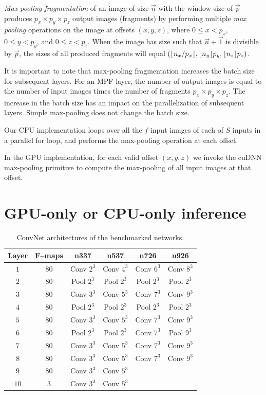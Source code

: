 \documentclass[conference]{./IEEEtran/IEEEtran}
\DeclarePairedDelimiter{\floor}{\lfloor}{\rfloor}
\begin{document}
  \emph{Max pooling fragmentation} of an image of size $\vec{n}$ with the
  window size of $\vec{p}$ produces $p_x \times p_y \times p_z$ output
  images (fragments) by performing multiple \emph{max pooling}
  operations on the image at offsets $(x,y,z)$, where $0 \le x < p_x$,
  $0 \le y < p_y$, and $0 \le z < p_z$.  When the image has size such
  that $\vec{n} + \vec{1}$ is divisible by $\vec{p}$, the sizes of all
  produced fragments will equal
  $(\floor{n_x/p_x},\floor{n_y}{p_y},\floor{n_z}{p_z})$.

  It is important to note that max-pooling fragmentation increases the
  batch size for subsequent layers.  For an MPF layer, the number of
  output images is equal to the number of input images times the
  number of fragments $p_x \times p_y \times p_z$.  The increase in
  the batch size has an impact on the parallelization of subsequent
  layers.  Simple max-pooling does not change the batch size.

  Our CPU implementation loops over all the $f$ input images of each
  of $S$ inputs in a parallel for loop, and performs the max-pooling
  operation at each offset.

  In the GPU implementation, for each valid offset $(x,y,z)$ we invoke
  the cuDNN max-pooling primitive to compute the max-pooling of all
  input images at that offset.

\section{GPU-only or CPU-only inference}

  \begin{table}
    {\footnotesize
    \centering
    \begin{tabular}{cccccc}
      \toprule
      Layer & F--maps & n337    & n537  &  n726  &  n926 \\
      \midrule
      $1$ & 80 &  Conv $2^3$  & Conv $4^3$  & Conv $6^3$  & Conv $8^3$ \\
      $2$ & 80 &  Pool $2^3$  & Pool $2^3$  & Pool $2^3$  & Pool $2^3$ \\
      $3$ & 80 &  Conv $3^3$  & Conv $5^3$  & Conv $7^3$  & Conv $9^3$ \\
      $4$ & 80 &  Pool $2^3$  & Pool $2^3$  & Pool $2^3$  & Pool $2^3$ \\
      $5$ & 80 &  Conv $3^3$  & Conv $5^3$  & Conv $7^3$  & Conv $9^3$ \\
      $6$ & 80 &  Pool $2^3$  & Pool $2^3$  & Conv $7^3$  & Pool $9^3$ \\
      $7$ & 80 &  Conv $3^3$  & Conv $5^3$  & Conv $7^3$  & Conv $9^3$ \\
      $8$ & 80 &  Conv $3^3$  & Conv $5^3$  & Conv $7^3$  & Conv $9^3$ \\
      $9$ & 80 & Conv $3^3$  & Conv $5^3$  & & \\
      $10$ & 3 & Conv $3^3$  & Conv $5^3$  & & \\
      \bottomrule
    \end{tabular}
    \caption{ConvNet architectures of the benchmarked networks.}
    \label{table:benchmarked_networks}
    }
  \end{table}
\end{document}
